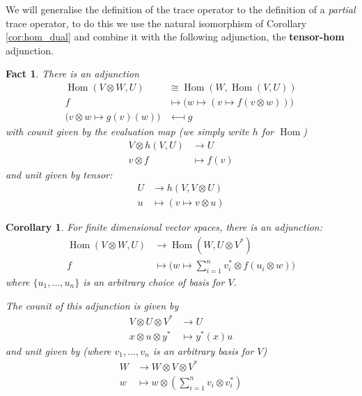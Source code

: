 \documentclass[12pt]{article}
\theoremstyle{plain}
\newtheorem{fact}[thm]{Fact}
\newtheorem{cor}[thm]{Corollary}
\theoremstyle{definition}
\newcommand{\lto}{\longrightarrow}
\begin{document}
We will generalise the definition of the trace operator to the definition of a \emph{partial} trace operator, to do this we use the natural isomorphism of Corollary \ref{cor:hom_dual} and combine it with the following adjunction, the \textbf{tensor-hom} adjunction.
\begin{fact}
	There is an adjunction
	\begin{align}
		\operatorname{Hom}(V \otimes W, U) &\cong \operatorname{Hom}(W, \operatorname{Hom}(V,U))\\
		f &\longmapsto \big(w \mapsto (v \mapsto f(v\otimes w))\big)\\
		\big(v \otimes w \mapsto g(v)(w) \big) &\longmapsfrom g
	\end{align}
	with counit given by the evaluation map (we simply write $h$ for $\operatorname{Hom}$)
	\begin{align*}
		V \otimes h(V,U) &\lto U\\
		v \otimes f &\longmapsto f(v)
	\end{align*}
	and unit given by tensor:
	\begin{align*}
		U &\lto h(V,V \otimes U)\\
		u &\longmapsto (v \mapsto v \otimes u)
	\end{align*}
\end{fact}
\begin{cor}
	For finite dimensional vector spaces, there is an adjunction:
	\begin{align}\label{eq:tensor_dual_adjunction}
		\operatorname{Hom}(V \otimes W, U) &\lto \operatorname{Hom}(W, U \otimes V^\ast)\\
		f &\longmapsto \big(w \mapsto \sum_{i = 1}^n v_i^\ast \otimes f(u_i \otimes w)\big)
	\end{align}
	where $\lbrace u_1,...,u_n\rbrace$ is an arbitrary choice of basis for $V$.
	
	The counit of this adjunction is given by
	\begin{align*}
		V \otimes U \otimes V^\ast &\lto U\\
		x \otimes u \otimes y^\ast &\longmapsto y^\ast(x )u
	\end{align*}
	and unit given by (where $v_1,...,v_n$ is an arbitrary basis for $V$)
	\begin{align*}
		W &\lto W \otimes V \otimes V^\ast\\
		w &\longmapsto w \otimes (\sum_{i = 1}^n v_i \otimes v_i^\ast)
	\end{align*}
\end{cor}
\end{document}
